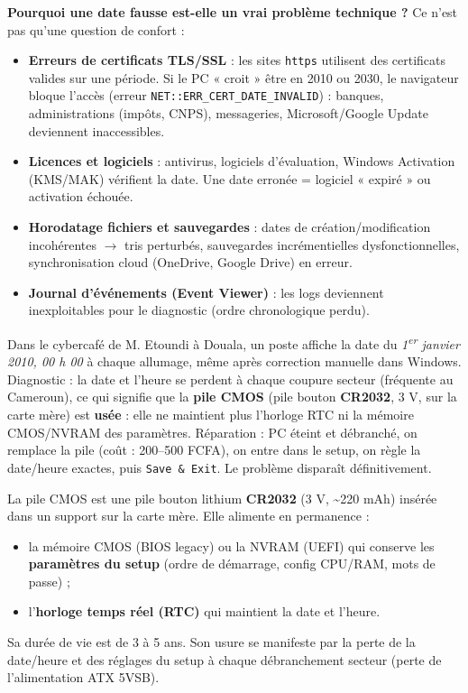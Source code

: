 \documentclass[11pt]{article}
\newcommand{\cle}[1]{{\popxbold\color{popdark}#1}}
\begin{document}
\textbf{Pourquoi une date fausse est-elle un vrai problème technique ?} Ce n'est pas qu'une question de confort :
\begin{itemize}
  \item \textbf{Erreurs de certificats TLS/SSL} : les sites \texttt{https} utilisent des certificats valides sur une période. Si le PC « croit » être en 2010 ou 2030, le navigateur bloque l'accès (erreur \texttt{NET::ERR\_CERT\_DATE\_INVALID}) : banques, administrations (impôts, CNPS), messageries, Microsoft/Google Update deviennent inaccessibles.
  \item \textbf{Licences et logiciels} : antivirus, logiciels d'évaluation, Windows Activation (KMS/MAK) vérifient la date. Une date erronée = logiciel « expiré » ou activation échouée.
  \item \textbf{Horodatage fichiers et sauvegardes} : dates de création/modification incohérentes $\to$ tris perturbés, sauvegardes incrémentielles dysfonctionnelles, synchronisation cloud (OneDrive, Google Drive) en erreur.
  \item \textbf{Journal d'événements (Event Viewer)} : les logs deviennent inexploitables pour le diagnostic (ordre chronologique perdu).
\end{itemize}

\begin{exemplebox}
Dans le cybercafé de M. Etoundi à Douala, un poste affiche la date du \emph{1\textsuperscript{er} janvier 2010, 00 h 00} à chaque allumage, même après correction manuelle dans Windows. Diagnostic : la date et l'heure se perdent à chaque coupure secteur (fréquente au Cameroun), ce qui signifie que la \textbf{pile CMOS} (pile bouton \textbf{CR2032}, 3 V, sur la carte mère) est \textbf{usée} : elle ne maintient plus l'horloge RTC ni la mémoire CMOS/NVRAM des paramètres. Réparation : PC éteint et débranché, on remplace la pile (coût : 200--500 FCFA), on entre dans le setup, on règle la date/heure exactes, puis \texttt{Save \& Exit}. Le problème disparaît définitivement.
\end{exemplebox}

\begin{definition}
La \cle{pile CMOS} est une pile bouton lithium \textbf{CR2032} (3 V, \textasciitilde 220 mAh) insérée dans un support sur la carte mère. Elle alimente en permanence :
\begin{itemize}
  \item la mémoire \cle{CMOS} (BIOS legacy) ou la NVRAM (UEFI) qui conserve les \textbf{paramètres du setup} (ordre de démarrage, config CPU/RAM, mots de passe) ;
  \item l'\textbf{horloge temps réel (RTC)} qui maintient la date et l'heure.
\end{itemize}
Sa durée de vie est de 3 à 5 ans. Son usure se manifeste par la perte de la date/heure et des réglages du setup à chaque débranchement secteur (perte de l'alimentation ATX 5VSB).
\end{definition}
\end{document}

